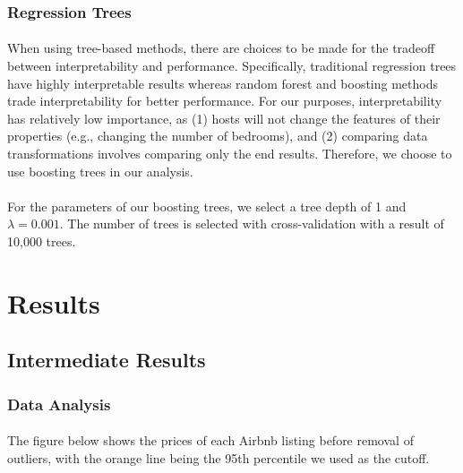 \documentclass[11pt]{article}
\begin{document}
            \subsubsection{Regression Trees}
            	\paragraph{}
                	When using tree-based methods, there are choices to be made for the tradeoff between interpretability and performance. Specifically, traditional regression trees have highly interpretable results whereas random forest and boosting methods trade interpretability for better performance. For our purposes, interpretability has relatively low importance, as (1) hosts will not change the features of their properties (e.g., changing the number of bedrooms), and (2) comparing data transformations involves comparing only the end results. Therefore, we choose to use boosting trees in our analysis.
             	\paragraph{}
                	For the parameters of our boosting trees, we select a tree depth of 1 and $\lambda = 0.001$. The number of trees is selected with cross-validation with a result of 10,000 trees.  
        
    
    
    \section{Results}
    \subsection{Intermediate Results}
    	\subsubsection{Data Analysis}
        	\paragraph{}
            	The figure below shows the prices of each Airbnb listing before removal of outliers, with the orange line being the 95th percentile we used as the cutoff.
                
\end{document}
